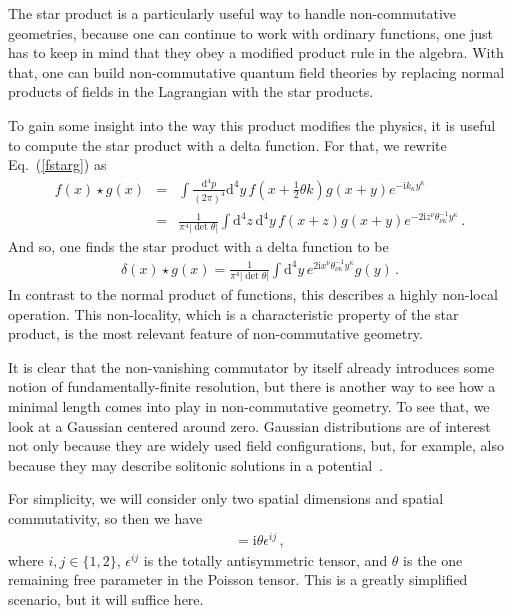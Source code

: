 \documentclass{article}
\def\beqn{\begin{eqnarray}}
\def\eeqn{\end{eqnarray}}
\begin{document}
The star product is a particularly useful way to handle non-commutative geometries, because one can continue to
work with ordinary functions, one just has to keep in mind that they obey a modified product rule in the algebra. 
With that, one can build non-commutative quantum field theories by replacing normal products of fields in the
Lagrangian with the star products.

To gain some insight into the way this product modifies the physics, it is useful to compute the star product with 
a delta function. For that, we rewrite Eq.~(\ref{fstarg}) as
\beqn
f(x) \star g(x) &=& \int \frac{\mathrm{d}^4 p}{(2 \pi)^4 }
\mathrm{d}^4 y \, f(x+\frac{1}{2} \theta k) g (x+ y)
 e^{- \mathrm{i} k_{\kappa} y^\kappa}  \nonumber \\
&=&
\frac{1}{\pi^4 \left| \det \theta \right|} \int \mathrm{d}^4 z \, \mathrm{d}^4 y\, f(x+z) g(x+ y) e^{-2\mathrm{i} z^\nu \theta^{-1}_{\nu \kappa} y^\kappa}\,. 
\eeqn
And so, one finds the star product with a delta function to be
\beqn
\delta(x) \star g(x) = 
\frac{1}{\pi^4 \left|\det\theta \right|} \int \mathrm{d}^4 y \, e^{2 \mathrm{i} x^\nu \theta^{-1}_{\nu \kappa} y^\kappa} g(y) \,.
\eeqn
In contrast to the normal product of functions, this describes a highly non-local operation. This non-locality, which
is a characteristic property of the star product, is the most relevant feature of non-commutative geometry.

It is clear that the non-vanishing commutator by itself already introduces some notion of fundamentally-finite resolution,
but there is another way to see how a minimal length comes into play in non-commutative geometry. To see that, we look at a 
Gaussian centered around zero. Gaussian distributions are of interest not only because they are widely used field 
configurations, but, for example, also because they may describe solitonic solutions in a potential~\cite{Gopakumar:2000zd}. 

For simplicity, we will consider only two spatial dimensions and spatial commutativity, 
so then we have
\beqn
[\hat x^i, \hat x^j] = \mathrm{i} \theta \epsilon^{ij}\,,
\eeqn
where $i,j \in \{1,2 \}$, $\epsilon^{ij}$ is the totally antisymmetric tensor, and $\theta$ is the one remaining
free parameter in the Poisson tensor. This is a greatly simplified scenario, but it
will suffice here. 
\end{document}
